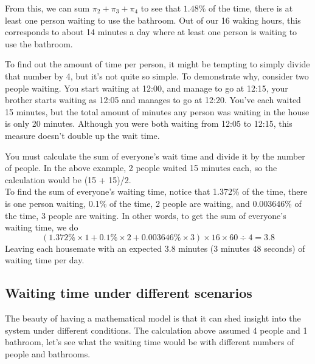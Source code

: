 From this, we can sum $\pi_2 + \pi_3 + \pi_4$ to see that $1.48\%$ of the time, there is at least one person waiting to use the bathroom. Out of our 16 waking hours, this corresponds to about 14 minutes a day where at least one person is waiting to use the bathroom.

To find out the amount of time per person, it might be tempting to simply divide that number by 4, but it's not quite so simple. To demonstrate why, consider two people waiting. You start waiting at 12:00, and manage to go at 12:15, your brother starts waiting as 12:05 and manages to go at 12:20. You've each waited 15 minutes, but the total amount of minutes any person was waiting in the house is only 20 minutes. Although you were both waiting from 12:05 to 12:15, this measure doesn't double up the wait time.

You must calculate the sum of everyone's wait time and divide it by the number of people. In the above example, 2 people waited 15 minutes each, so the calculation would be (15 + 15)/2.
\\

To find the sum of everyone's waiting time, notice that 1.372\% of the time, there is one person waiting, 0.1\% of the time, 2 people are waiting, and 0.003646\% of the time, 3 people are waiting. In other words, to get the sum of everyone's waiting time, we do
$$ (1.372\% \times 1 + 0.1\% \times 2 + 0.003646\% \times 3) \times 16 \times 60 \div 4 = 3.8 $$
Leaving each housemate with an expected 3.8 minutes (3 minutes 48 seconds) of waiting time per day.

\subsection*{Waiting time under different scenarios}
The beauty of having a mathematical model is that it can shed insight into the system under different conditions. The calculation above assumed 4 people and 1 bathroom, let's see what the waiting time would be with different numbers of people and bathrooms.

